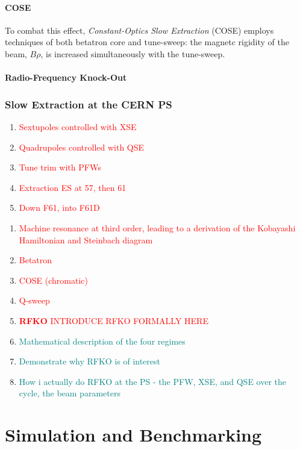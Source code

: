 \documentclass[11pt]{report}
\newcommand\todo[1]{\textcolor{red}{#1}}
\begin{document}
\subsubsection{COSE}
To combat this effect, \textit{Constant-Optics Slow Extraction} (COSE) employs techniques of both betatron core and tune-sweep: the magnetc rigidity of the beam, $B\rho$, is increased simultaneously with the tune-sweep.

\subsubsection{Radio-Frequency Knock-Out}

\subsection{Slow Extraction at the CERN PS}

\begin{enumerate}
  \item \todo{Sextupoles controlled with XSE}
  \item \todo{Quadrupoles controlled with QSE}
  \item \todo{Tune trim with PFWs}
  \item \todo{Extraction ES at 57, then 61}
  \item \todo{Down F61, into F61D}
\end{enumerate}

\begin{enumerate}
  \item \todo{Machine resonance at third order, leading to a derivation of the Kobayashi Hamiltonian and Steinbach diagram} \checkmark
  \item \todo{Betatron} \checkmark
  \item \todo{COSE (chromatic)}
  \item \todo{Q-sweep}
  \item \todo{\textbf{RFKO} INTRODUCE RFKO FORMALLY HERE}
  \item \textcolor{teal}{Mathematical description of the four regimes}
  
  \item \textcolor{teal}{Demonstrate why RFKO is of interest}
  \item \textcolor{teal}{How i actually do RFKO at the PS - the PFW, XSE, and QSE over the cycle, the beam parameters}
\end{enumerate}


\chapter{Simulation and Benchmarking}
\end{document}
